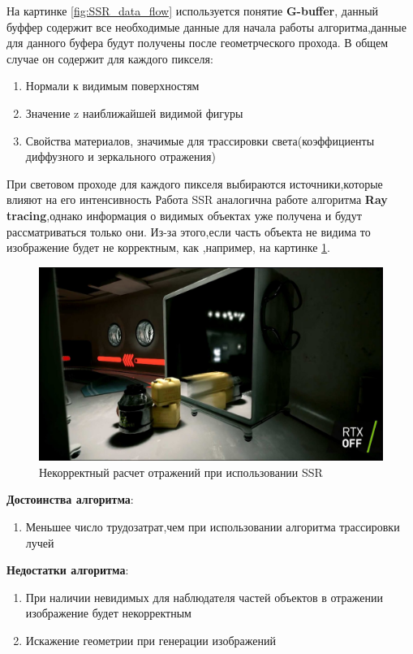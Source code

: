 \documentclass[a4paper,14pt, unknownkeysallowed]{extreport}
\begin{document}
На картинке \ref{fig:SSR_data_flow} используется понятие \textbf{G-buffer}, данный буффер содержит все необходимые данные для начала работы алгоритма,данные для данного буфера
будут получены после геометрческого прохода. В общем случае он содержит для каждого пикселя:
\begin{enumerate}
	\item Нормали к видимым поверхностям
	\item Значение z наиближайшей видимой фигуры
	\item Свойства материалов, значимые для трассировки света(коэффициенты диффузного и зеркального отражения)
\end{enumerate}
При световом проходе для каждого пикселя выбираются источники,которые влияют на его интенсивность
Работа SSR аналогична работе алгоритма \textbf{Ray tracing},однако информация о видимых объектах уже получена и будут рассматриваться только они.
Из-за этого,если часть объекта не видима то изображение будет не корректным, как ,например, на картинке \ref{fig:SSR_fail}.
\begin{figure}[h]
	\centering
	\includegraphics[scale=0.4]{SSR_fail.jpg}
	\caption{Некорректный расчет отражений при использовании SSR}
	\label{fig:SSR_fail}
\end{figure} 

\textbf{Достоинства алгоритма}:
\begin{enumerate}
	\item Меньшее число трудозатрат,чем при использовании алгоритма трассировки лучей
\end{enumerate}

\textbf{Недостатки алгоритма}:
\begin{enumerate}
	\item При наличии невидимых для наблюдателя частей объектов в отражении изображение будет некорректным
	\item Искажение геометрии при генерации изображений
\end{enumerate}
\end{document}
